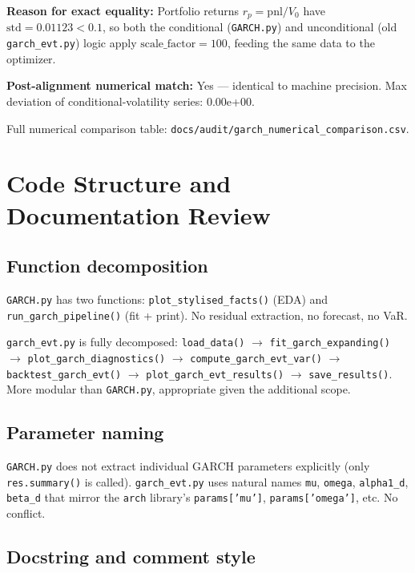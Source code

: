 \documentclass[11pt,a4paper]{article}
\newcommand{\code}[1]{\texttt{#1}}
\begin{document}
\noindent\textbf{Reason for exact equality:} Portfolio returns
$r_p = \mathrm{pnl}/V_0$ have $\mathrm{std} = 0.01123 < 0.1$, so both the
conditional (\code{GARCH.py}) and unconditional (old \code{garch\_evt.py})
logic apply $\mathrm{scale\_factor} = 100$, feeding the same data to the
optimizer.

\textbf{Post-alignment numerical match:} Yes --- identical to machine
precision.  Max deviation of conditional-volatility series: 0.00e+00.

Full numerical comparison table:
\code{docs/audit/garch\_numerical\_comparison.csv}.

\section{Code Structure and Documentation Review}\label{sec:structure}

\subsection{Function decomposition}

\code{GARCH.py} has two functions: \code{plot\_stylised\_facts()} (EDA) and
\code{run\_garch\_pipeline()} (fit + print).  No residual extraction, no
forecast, no VaR.

\code{garch\_evt.py} is fully decomposed: \code{load\_data()} $\to$
\code{fit\_garch\_expanding()} $\to$ \code{plot\_garch\_diagnostics()} $\to$
\code{compute\_garch\_evt\_var()} $\to$ \code{backtest\_garch\_evt()} $\to$
\code{plot\_garch\_evt\_results()} $\to$ \code{save\_results()}.  More modular
than \code{GARCH.py}, appropriate given the additional scope.

\subsection{Parameter naming}

\code{GARCH.py} does not extract individual GARCH parameters explicitly
(only \code{res.summary()} is called). \code{garch\_evt.py} uses natural
names \code{mu}, \code{omega}, \code{alpha1\_d}, \code{beta\_d} that
mirror the \code{arch} library's \code{params['mu']}, \code{params['omega']},
etc. No conflict.

\subsection{Docstring and comment style}
\end{document}
